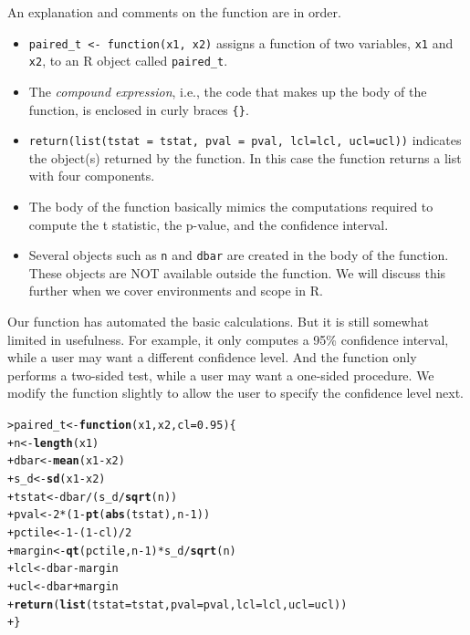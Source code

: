 \documentclass[12pt,oneside]{book}\usepackage[]{graphicx}\usepackage[]{color}
\makeatletter
\newcommand{\hlnum}[1]{\textcolor[rgb]{0.686,0.059,0.569}{#1}}%
\newcommand{\hlopt}[1]{\textcolor[rgb]{0,0,0}{#1}}%
\newcommand{\hlstd}[1]{\textcolor[rgb]{0.345,0.345,0.345}{#1}}%
\newcommand{\hlkwa}[1]{\textcolor[rgb]{0.161,0.373,0.58}{\textbf{#1}}}%
\newcommand{\hlkwb}[1]{\textcolor[rgb]{0.69,0.353,0.396}{#1}}%
\newcommand{\hlkwc}[1]{\textcolor[rgb]{0.333,0.667,0.333}{#1}}%
\newcommand{\hlkwd}[1]{\textcolor[rgb]{0.737,0.353,0.396}{\textbf{#1}}}%
\newenvironment{kframe}{%
 \def\at@end@of@kframe{}%
 \ifinner\ifhmode%
  \def\at@end@of@kframe{\end{minipage}}%
  \begin{minipage}{\columnwidth}%
 \fi\fi%
 \def\FrameCommand##1{\hskip\@totalleftmargin \hskip-\fboxsep
 \colorbox{shadecolor}{##1}\hskip-\fboxsep
     \hskip-\linewidth \hskip-\@totalleftmargin \hskip\columnwidth}%
 \MakeFramed {\advance\hsize-\width
   \@totalleftmargin\z@ \linewidth\hsize
   \@setminipage}}%
 {\par\unskip\endMakeFramed%
 \at@end@of@kframe}
\newenvironment{knitrout}{}{} %
\makeatother
\begin{document}
An explanation and comments on the function are in order.
\begin{itemize}
\item \verb+paired_t <- function(x1, x2)+ assigns a function of two variables, \verb+x1+ and \verb+x2+, to an R object called \verb+paired_t+. 
\item The \emph{compound expression}, i.e., the code that makes up the body of the function, is enclosed in curly braces \verb+{}+.
\item \verb+return(list(tstat = tstat, pval = pval, lcl=lcl, ucl=ucl))+ indicates the object(s) returned by the function. In this case the function returns a list with four components. 
\item The body of the function basically mimics the computations required to compute the t statistic, the p-value, and the confidence interval.
\item Several objects such as \verb+n+ and \verb+dbar+ are created in the body of the function. These objects are NOT available outside the function. We will discuss this further when we cover environments and scope in R.
\end{itemize}

Our function has automated the basic calculations. But it is still somewhat limited in usefulness. For example, it only computes a 95\% confidence interval, while a user may want a different confidence level. And the function only performs a two-sided test, while a user may want a one-sided procedure.  We modify the function slightly to allow the user to specify the confidence level next.
\begin{knitrout}
\color{fgcolor}\begin{kframe}
\begin{alltt}
\hlstd{> }\hlstd{paired_t} \hlkwb{<-} \hlkwa{function}\hlstd{(}\hlkwc{x1}\hlstd{,} \hlkwc{x2}\hlstd{,} \hlkwc{cl} \hlstd{=} \hlnum{0.95}\hlstd{) \{}
\hlstd{+ }    \hlstd{n} \hlkwb{<-} \hlkwd{length}\hlstd{(x1)}
\hlstd{+ }    \hlstd{dbar} \hlkwb{<-} \hlkwd{mean}\hlstd{(x1} \hlopt{-} \hlstd{x2)}
\hlstd{+ }    \hlstd{s_d} \hlkwb{<-} \hlkwd{sd}\hlstd{(x1} \hlopt{-} \hlstd{x2)}
\hlstd{+ }    \hlstd{tstat} \hlkwb{<-} \hlstd{dbar}\hlopt{/}\hlstd{(s_d}\hlopt{/}\hlkwd{sqrt}\hlstd{(n))}
\hlstd{+ }    \hlstd{pval} \hlkwb{<-} \hlnum{2} \hlopt{*} \hlstd{(}\hlnum{1} \hlopt{-} \hlkwd{pt}\hlstd{(}\hlkwd{abs}\hlstd{(tstat), n} \hlopt{-} \hlnum{1}\hlstd{))}
\hlstd{+ }    \hlstd{pctile} \hlkwb{<-} \hlnum{1} \hlopt{-} \hlstd{(}\hlnum{1} \hlopt{-} \hlstd{cl)}\hlopt{/}\hlnum{2}
\hlstd{+ }    \hlstd{margin} \hlkwb{<-} \hlkwd{qt}\hlstd{(pctile, n} \hlopt{-} \hlnum{1}\hlstd{)} \hlopt{*} \hlstd{s_d}\hlopt{/}\hlkwd{sqrt}\hlstd{(n)}
\hlstd{+ }    \hlstd{lcl} \hlkwb{<-} \hlstd{dbar} \hlopt{-} \hlstd{margin}
\hlstd{+ }    \hlstd{ucl} \hlkwb{<-} \hlstd{dbar} \hlopt{+} \hlstd{margin}
\hlstd{+ }    \hlkwd{return}\hlstd{(}\hlkwd{list}\hlstd{(}\hlkwc{tstat} \hlstd{= tstat,} \hlkwc{pval} \hlstd{= pval,} \hlkwc{lcl} \hlstd{= lcl,} \hlkwc{ucl} \hlstd{= ucl))}
\hlstd{+ }\hlstd{\}}
\end{alltt}
\end{kframe}
\end{knitrout}
\end{document}
